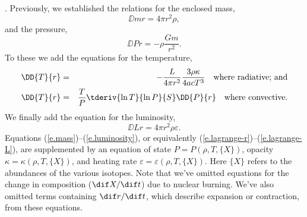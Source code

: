 %

. Previously, we established the relations for the enclosed mass,
\begin{equation}\label{e.mass}
\DD{m}{r} = 4\pi r^{2}\rho,
\end{equation}
and the pressure,
\begin{equation}\label{e.pressure}
\DD{P}{r} = -\rho\frac{Gm}{r^{2}}.
\end{equation}
To these we add the equations for the temperature,
\begin{eqnarray}\label{e.temperature-radiative}
\DD{T}{r} &=& - \frac{L}{4\pi r^{2}}\frac{3\rho\kappa}{4ac T^{3}}\quad\textrm{where radiative; and}\\
\label{e.temperature-convective}
\DD{T}{r} &=& \frac{T}{P}\tderiv{\ln T}{\ln P}{S}\DD{P}{r}\quad\textrm{where convective}.
\end{eqnarray}
We finally add the equation for the luminosity,
\begin{equation}
\label{e.luminosity}
\DD{L}{r} = 4\pi r^{2}\rho\varepsilon.
\end{equation}
Equations (\ref{e.mass})--(\ref{e.luminosity}), or equivalently (\ref{e.lagrange-r})--(\ref{e.lagrange-L}), are supplemented by an equation of state $P = P(\rho,T,\{X\})$, opacity $\kappa = \kappa(\rho,T,\{X\})$, and heating rate $\varepsilon=\varepsilon(\rho,T,\{X\})$. Here $\{X\}$ refers to the abundances of the various isotopes. Note that we've omitted equations for the change in composition ($\dif X/\dif t$) due to nuclear burning. We've also omitted terms containing $\dif r/\dif t$, which describe expansion or contraction, from these equations.

